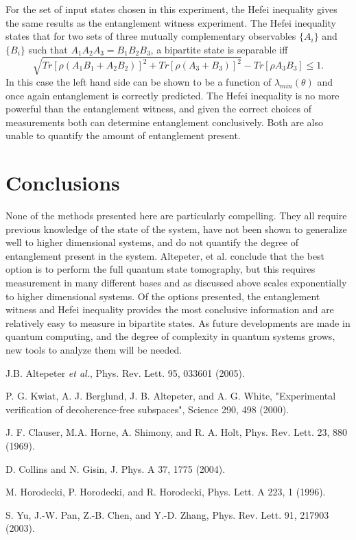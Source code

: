 \documentclass[11pt]{article}
\begin{document}
For the set of input states chosen in this experiment, the Hefei inequality gives the same results as
the entanglement witness experiment.  The Hefei inequality states that for two sets of three mutually
complementary observables \(\{A_i\}\) and \(\{B_i\}\) such that \(A_1A_2A_3 = B_1B_2B_3\), a bipartite state
is separable iff\cite{yu03} 
\[ \sqrt{Tr[\rho(A_1B_1 + A_2B_2)]^2 + Tr[\rho(A_3 + B_3)]^2} - Tr[\rho A_3B_3] \leq 1. \]
In this case the left hand side can be shown to be a function of \(\lambda_{min} (\theta)\) and once 
again entanglement is correctly
predicted.  The Hefei inequality is no more powerful than the entanglement witness, and given the correct
choices of measurements both can determine entanglement conclusively.  Both are also unable to quantify
the amount of entanglement present.

\section{Conclusions}
None of the methods presented here are particularly compelling.  They all require previous knowledge of the state of
the system, have not been shown to generalize well to higher dimensional systems, and do not quantify the degree 
of entanglement
present in the system.  Altepeter, et al. conclude that the best option is to perform the full quantum state 
tomography\cite{altepeter05}, but this requires measurement in many different bases and as discussed above 
scales exponentially to higher dimensional systems.  Of the options presented, the entanglement witness and
Hefei inequality
provides the most conclusive information and are relatively easy to measure in bipartite states.  
As future developments are made in quantum computing, and the degree of complexity in quantum systems grows, 
new tools to analyze them will be needed.

\begin{thebibliography}{99}
 J.B. Altepeter \emph{et al.}, Phys. Rev. Lett. 95, 033601 (2005).

 P. G. Kwiat, A. J. Berglund, J. B. Altepeter, and A. G. White, 
	"Experimental verification of decoherence-free subspaces", Science 290, 498 (2000).
	
 J. F. Clauser, M.A. Horne, A. Shimony, and R. A. Holt,
	Phys. Rev. Lett. 23, 880 (1969).
	
 D. Collins and N. Gisin, J. Phys. A 37, 1775 (2004).

 M. Horodecki, P. Horodecki, and R. Horodecki, Phys. Lett. A 223, 1 (1996).

 S. Yu, J.-W. Pan, Z.-B. Chen, and Y.-D. Zhang, Phys. Rev.
	Lett. 91, 217903 (2003).
\end{thebibliography}
\end{document}
